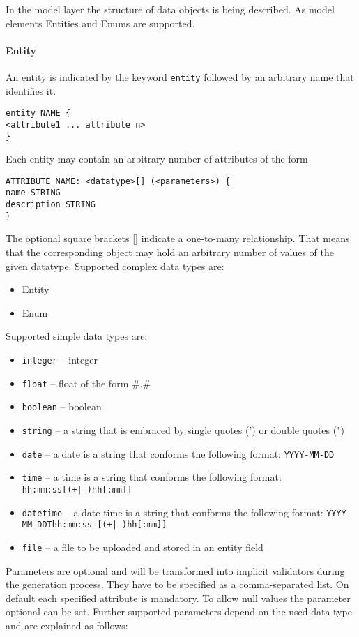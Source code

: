
In the model layer the structure of data objects is being described. As model elements Entities and Enums are supported.
\paragraph{Entity}
An entity is indicated by the keyword {\lstinline!entity!} followed by an arbitrary name that identifies it.
\begin{lstlisting}
entity NAME {
<attribute1 ... attribute n>
}
\end{lstlisting}
Each entity may contain an arbitrary number of attributes of the form
\begin{lstlisting}
ATTRIBUTE_NAME: <datatype>[] (<parameters>) {
name STRING
description STRING
}
\end{lstlisting}
The optional square brackets [] indicate a one-to-many relationship. That means that the corresponding object may hold an arbitrary number of values of the given datatype.
Supported complex data types are:
\begin{itemize}
\item{Entity}
\item{Enum}
\end{itemize}
Supported simple data types are:

\begin{itemize}
\item{\lstinline!integer! -- integer}
\item{\lstinline!float! -- float of the form \#.\#}
\item{\lstinline!boolean! -- boolean}
\item{\lstinline!string! -- a string that is embraced by single quotes (') or double quotes (")}
\item{\lstinline!date! -- a date is a string that conforms the following format: \lstinline!YYYY-MM-DD!}
\item{\lstinline!time! -- a time is a string that conforms the following format: \lstinline!hh:mm:ss[(+|-)hh[:mm]]!}
\item{\lstinline!datetime! -- a date time is a string that conforms the following format: \lstinline!YYYY-MM-DDThh:mm:ss [(+|-)hh[:mm]]!}
\item{\lstinline!file! -- a file to be uploaded and stored in an entity field}
\end{itemize}

Parameters are optional and will be transformed into implicit validators during the generation process. They have to be specified as a comma-separated list. On default each specified attribute is mandatory. To allow null values the parameter optional can be set. Further supported parameters depend on the used data type and are explained as follows:

